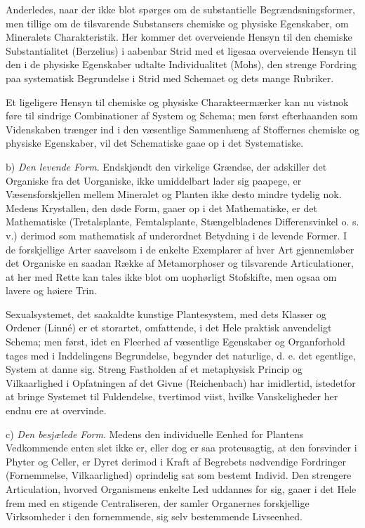 \documentclass[12pt]{book}
\newcommand{\opage}[1]{\marginnote{\footnotesize\textit{[#1]}}}
\begin{document}
Anderledes, naar der ikke blot spørges om de substantielle Begrændsningsformer, men tillige
om de tilsvarende Substansers chemiske og physiske Egenskaber, om Mineralets Charakteristik.
Her kommer det overveiende Hensyn til den chemiske Substantialitet (Berzelius) i aabenbar
Strid med et ligesaa overveiende Hensyn til den i de physiske Egenskaber udtalte
Individualitet (Mohs), den strenge Fordring paa systematisk Begrundelse i Strid med Schemaet
og dets mange Rubriker.

Et ligeligere Hensyn til chemiske og physiske Charakteermærker kan nu vistnok føre til
sindrige Combinationer af
\opage{93} System og Schema; men først efterhaanden som Videnskaben trænger ind i den væsentlige
Sammenhæng af Stoffernes chemiske og physiske Egenskaber, vil det Schematiske gaae op i det
Systematiske.

b) \emph{Den levende Form}. Endskjøndt den virkelige Grændse, der adskiller det Organiske fra
det Uorganiske, ikke umiddelbart lader sig paapege, er Væsensforskjellen mellem Mineralet og
Planten ikke desto mindre tydelig nok. Medens Krystallen, den døde Form, gaaer op i det
Mathematiske, er det Mathematiske (Tretalsplante, Femtalsplante, Stængelbladenes
Differensvinkel o. s. v.) derimod som mathematisk af underordnet Betydning i de levende
Former. I de forskjellige Arter saavelsom i de enkelte Exemplarer af hver Art gjennemløber
det Organiske en saadan Række af Metamorphoser og tilsvarende Articulationer, at her med
Rette kan tales ikke blot om uophørligt Stofskifte, men ogsaa om lavere og høiere Trin.

Sexualsystemet, det saakaldte kunstige Plantesystem, med dets Klasser og Ordener (Linné) er
et storartet, omfattende, i det Hele praktisk anvendeligt Schema; men først, idet en Fleerhed
af væsentlige Egenskaber og Organforhold tages med i Inddelingens Begrundelse, begynder det
naturlige, d. e. det egentlige, System at danne sig. Streng Fastholden af et metaphysisk
Princip og Vilkaarlighed i Opfatningen af det Givne (Reichenbach) har imidlertid, istedetfor
at bringe Systemet til Fuldendelse, tvertimod viist, hvilke Vanskeligheder her endnu ere at
overvinde.

c) \emph{Den besjælede Form}. Medens den individuelle Eenhed for Plantens Vedkommende enten
slet ikke er, eller dog er saa proteusagtig, at den forsvinder i Phyter og Celler, er Dyret
derimod i Kraft af Begrebets nødvendige Fordringer (Fornemmelse, Vilkaarlighed) oprindelig
sat som bestemt Individ. Den strengere Articulation, hvorved Organismens enkelte Led
uddannes for sig, gaaer i det Hele frem med en stigende Centraliseren, der samler Organernes
\opage{94} forskjellige Virksomheder i den fornemmende, sig selv bestemmende Livseenhed.
\end{document}
